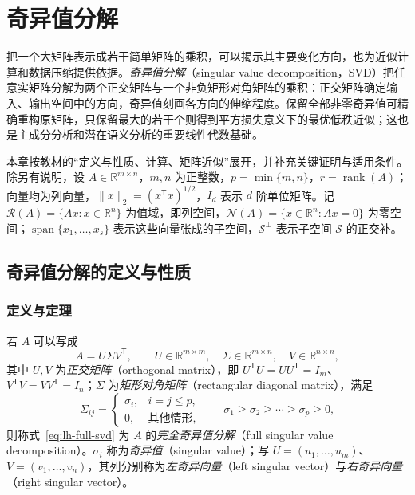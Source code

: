 \setcounter{chapter}{14} %
\chapter{奇异值分解}
\label{ch:lh-svd}

把一个大矩阵表示成若干简单矩阵的乘积，可以揭示其主要变化方向，也为近似计算和数据压缩提供依据。\emph{奇异值分解}（singular value decomposition，SVD）把任意实矩阵分解为两个正交矩阵与一个非负矩形对角矩阵的乘积：正交矩阵确定输入、输出空间中的方向，奇异值刻画各方向的伸缩程度。保留全部非零奇异值可精确重构原矩阵，只保留最大的若干个则得到平方损失意义下的最优低秩近似；这也是主成分分析和潜在语义分析的重要线性代数基础。

本章按教材的“定义与性质、计算、矩阵近似”展开，并补充关键证明与适用条件。除另有说明，设 $A\in\mathbb R^{m\times n}$，$m,n$ 为正整数，$p=\min\{m,n\}$，$r=\operatorname{rank}(A)$；向量均为列向量，$\|x\|_2=(x^{\mathsf T}x)^{1/2}$，$I_d$ 表示 $d$ 阶单位矩阵。记 $\mathcal R(A)=\{Ax:x\in\mathbb R^n\}$ 为值域，即列空间，$\mathcal N(A)=\{x\in\mathbb R^n:Ax=0\}$ 为零空间；$\operatorname{span}\{x_1,\ldots,x_s\}$ 表示这些向量张成的子空间，$\mathcal S^\perp$ 表示子空间 $\mathcal S$ 的正交补。

\section{奇异值分解的定义与性质}
\label{sec:lh-svd-definition-properties}

\subsection{定义与定理}
\label{subsec:lh-svd-definition}

\begin{definition}[完全奇异值分解]
\label{def:lh-full-svd}
若 $A$ 可以写成
\begin{equation}
A=U\Sigma V^{\mathsf T},\qquad
U\in\mathbb R^{m\times m},\quad
\Sigma\in\mathbb R^{m\times n},\quad
V\in\mathbb R^{n\times n},
\label{eq:lh-full-svd}
\end{equation}
其中 $U,V$ 为\emph{正交矩阵}（orthogonal matrix），即 $U^{\mathsf T}U=UU^{\mathsf T}=I_m$、$V^{\mathsf T}V=VV^{\mathsf T}=I_n$；$\Sigma$ 为\emph{矩形对角矩阵}（rectangular diagonal matrix），满足
\begin{equation}
\Sigma_{ij}=
\begin{cases}
\sigma_i,&i=j\leq p,\\
0,&\text{其他情形},
\end{cases}
\qquad \sigma_1\geq\sigma_2\geq\cdots\geq\sigma_p\geq0,
\label{eq:lh-svd-rectangular-diagonal}
\end{equation}
则称式~\eqref{eq:lh-full-svd} 为 $A$ 的\emph{完全奇异值分解}（full singular value decomposition）。$\sigma_i$ 称为\emph{奇异值}（singular value）；写 $U=(u_1,\ldots,u_m)$、$V=(v_1,\ldots,v_n)$，其列分别称为\emph{左奇异向量}（left singular vector）与\emph{右奇异向量}（right singular vector）。
\end{definition}

